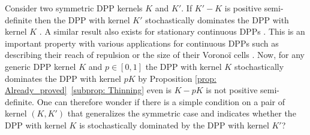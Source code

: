 \documentclass{article}
\numberwithin{equation}{section}
\theoremstyle{plain}
\begin{document}
Consider two symmetric DPP kernels $K$ and $K'$. If $K'-K$ is positive semi-definite then the DPP with kernel $K'$ stochastically dominates the DPP with kernel $K$ \cite{Lyons, Borcea}. A similar result also exists for stationary continuous DPPs \cite{Goldman}. This is an important property with various applications for continuous DPPs such as describing their reach of repulsion \cite{Bacceli} or the size of their Voronoï cells \cite{Goldman}. Now, for any generic DPP kernel $K$ and $p\in [0, 1]$ the DPP with kernel $K$ stochastically dominates the DPP with kernel $pK$ by Proposition \ref{prop: Already_proved}~\ref{subprop: Thinning} even is $K-pK$ is not positive semi-definite. One can therefore wonder if there is a simple condition on a pair of kernel $(K, K')$ that generalizes the symmetric case and indicates whether the DPP with kernel $K$ is stochastically dominated by the DPP with kernel $K'$?

%
%


%
%

\end{document}
